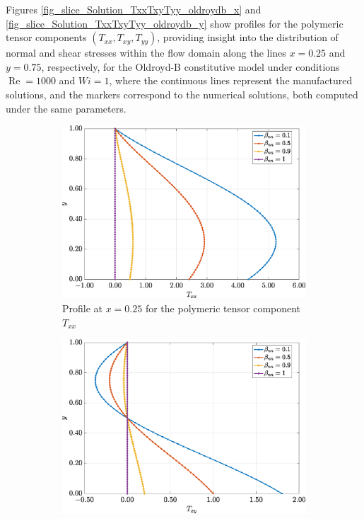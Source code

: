 \documentclass[preprint, 12pt]{elsarticle}
\begin{document}
Figures \ref{fig_slice_Solution_TxxTxyTyy_oldroydb_x} and
\ref{fig_slice_Solution_TxxTxyTyy_oldroydb_y} show profiles for the polymeric
tensor components $(T_{xx}, T_{xy}, T_{yy})$, providing insight into the
distribution of normal and shear stresses within the flow domain along the
lines $x=0.25$ and $y=0.75$, respectively, for the Oldroyd-B constitutive model
under conditions $\operatorname{Re}=1000$ and \mbox{$Wi=1$}, where the
continuous lines represent the manufactured solutions, and the markers
correspond to the numerical solutions, both computed under the same parameters.
\begin{figure}[H]
    \centering  
    \begin{subfigure}[b]{.46\textwidth}
        \includegraphics[width=\textwidth]{Slice_x_Tog_Numerical_NormErr_2nd_Betann_1_Re_1000_Wi_1_epsilon_0_xi_0_alphaG_0_Dt_1e-06_at_0.05_tipsim_1_MMS_12_x0.25y0.25_Txx.eps}
        \caption{Profile at $x=0.25$ for the polymeric tensor component $T_{xx}$}
        \label{fig_slice_x_txx_2nd_Case1_oldroydB}
    \end{subfigure}
    \vspace{0.2cm}
    \qquad
    \begin{subfigure}[b]{.46\textwidth}
        \includegraphics[width=\textwidth]{Slice_x_Tog_Numerical_NormErr_2nd_Betann_1_Re_1000_Wi_1_epsilon_0_xi_0_alphaG_0_Dt_1e-06_at_0.05_tipsim_1_MMS_12_x0.25y0.25_Txy.eps}

\end{subfigure}
\end{figure}
\end{document}
